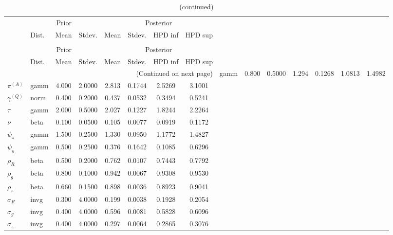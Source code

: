  
\begin{center}
\begin{longtable}{llcccccc} 
\caption{Results from Metropolis-Hastings (parameters)}
 \label{Table:MHPosterior:1}\\
\toprule 
  & \multicolumn{3}{c}{Prior}  &  \multicolumn{4}{c}{Posterior} \\
  \cmidrule(r{.75em}){2-4} \cmidrule(r{.75em}){5-8}
  & Dist. & Mean  & Stdev. & Mean & Stdev. & HPD inf & HPD sup\\
\midrule \endfirsthead 
\caption{(continued)}\\\toprule 
  & \multicolumn{3}{c}{Prior}  &  \multicolumn{4}{c}{Posterior} \\
  \cmidrule(r{.75em}){2-4} \cmidrule(r{.75em}){5-8}
  & Dist. & Mean  & Stdev. & Mean & Stdev. & HPD inf & HPD sup\\
\midrule \endhead 
\bottomrule \multicolumn{8}{r}{(Continued on next page)} \endfoot 
\bottomrule \endlastfoot 
${r_{A}}$ & gamm &   0.800 & 0.5000 &   1.294& 0.1268 &  1.0813 &  1.4982 \\ 
${\pi^{(A)}}$ & gamm &   4.000 & 2.0000 &   2.813& 0.1744 &  2.5269 &  3.1001 \\ 
${\gamma^{(Q)}}$ & norm &   0.400 & 0.2000 &   0.437& 0.0532 &  0.3494 &  0.5241 \\ 
${\tau}$ & gamm &   2.000 & 0.5000 &   2.027& 0.1227 &  1.8244 &  2.2264 \\ 
${\nu}$ & beta &   0.100 & 0.0500 &   0.105& 0.0077 &  0.0919 &  0.1172 \\ 
${\psi_\pi}$ & gamm &   1.500 & 0.2500 &   1.330& 0.0950 &  1.1772 &  1.4827 \\ 
${\psi_y}$ & gamm &   0.500 & 0.2500 &   0.376& 0.1642 &  0.1085 &  0.6296 \\ 
${\rho_R}$ & beta &   0.500 & 0.2000 &   0.762& 0.0107 &  0.7443 &  0.7792 \\ 
${\rho_{g}}$ & beta &   0.800 & 0.1000 &   0.942& 0.0067 &  0.9308 &  0.9530 \\ 
${\rho_z}$ & beta &   0.660 & 0.1500 &   0.898& 0.0036 &  0.8923 &  0.9041 \\ 
${\sigma_R}$ & invg &   0.300 & 4.0000 &   0.199& 0.0038 &  0.1928 &  0.2054 \\ 
${\sigma_{g}}$ & invg &   0.400 & 4.0000 &   0.596& 0.0081 &  0.5828 &  0.6096 \\ 
${\sigma_z}$ & invg &   0.400 & 4.0000 &   0.297& 0.0064 &  0.2865 &  0.3076 \\ 
\end{longtable}
 \end{center}
